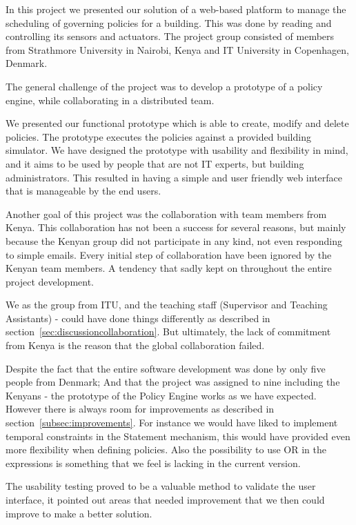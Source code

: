 In this project we presented our solution of a web-based platform to manage the scheduling of governing policies for a building. This was done by reading and controlling its sensors and actuators. The project group consisted of members from Strathmore University in Nairobi, Kenya and IT University in Copenhagen, Denmark.

The general challenge of the project was to develop a prototype of a policy engine, while collaborating in a distributed team. 

We presented our functional prototype which is able to create, modify and delete policies. The prototype executes the policies against a provided building simulator. We have designed the prototype with usability and flexibility in mind, and it aims to be used by people that are not IT experts, but building administrators. This resulted in having a simple and user friendly web interface that is manageable by the end users. 

Another goal of this project was the collaboration with team members from Kenya. This collaboration has not been a success for several reasons, but mainly because the Kenyan group did not participate in any kind,  not even responding to simple emails. Every initial step of collaboration have been ignored by the Kenyan team members. A tendency that sadly kept on throughout the entire project development.

We as the group from ITU, and the teaching staff (Supervisor and Teaching Assistants) - could have done things differently as described in section~\ref{sec:discussioncollaboration}. But ultimately, the lack of commitment from Kenya is the reason that the global collaboration failed.

Despite the fact that the entire software development was done by only five people from Denmark; And that the project was assigned to nine including the Kenyans - the prototype of the Policy Engine works as we have expected. However there is always room for improvements as described in section~\ref{subsec:improvements}. For instance we would have liked to implement temporal constraints in the Statement mechanism, this would have provided even more flexibility when defining policies. Also the possibility to use OR in the expressions is something that we feel is lacking in the current version.

The usability testing proved to be a valuable method to validate the user interface, it pointed out areas that needed improvement that we then could improve to make a better solution.